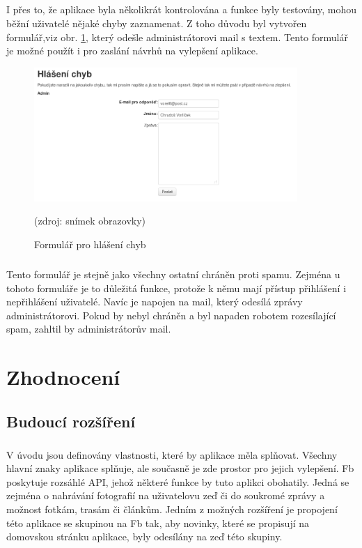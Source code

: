 \documentclass[11pt,a4paper,titlepage,oneside]{book}
\begin{document}
		\paragraph{}I přes to, že aplikace byla několikrát kontrolována a funkce byly testovány, mohou běžní uživatelé  nějaké chyby zaznamenat. Z toho důvodu byl vytvořen formulář,viz obr. \ref{fig:error}, který odešle administrátorovi mail s textem. Tento formulář je možné použít i pro zaslání návrhů na vylepšení aplikace. 
		\begin{figure}[!h]
			\begin{center}
				\includegraphics[width=10cm]{obrazky/toulavej/error.png}
				\caption{Formulář pro hlášení chyb}
				\label{fig:error}
				(zdroj: snímek obrazovky)
			\end{center}
		\end{figure}	
		\paragraph{}Tento formulář je stejně jako všechny ostatní chráněn proti spamu. Zejména u tohoto formuláře je to důležitá funkce, protože k němu mají přístup přihlášení i nepřihlášení uživatelé. Navíc je napojen na mail, který odesílá zprávy administrátorovi. Pokud by nebyl chráněn a byl napaden robotem rozesílající spam, zahltil by administrátorův mail.

		

	\chapter{Zhodnocení}
		\section{Budoucí rozšíření}
			\label{sec:budoucnost}
			\paragraph{}V úvodu jsou definovány vlastnosti, které by aplikace měla splňovat. Všechny hlavní znaky aplikace splňuje, ale současně je zde prostor pro jejich vylepšení. \ac{Fb} poskytuje rozsáhlé \ac{API}, jehož některé funkce by tuto aplikci obohatily. Jedná se zejména o nahrávání fotografií na uživatelovu zeď či do soukromé zprávy a možnost  fotkám, trasám či článkům. Jedním z možných rozšíření je propojení této aplikace se skupinou na \ac{Fb} tak, aby novinky, které se propisují na domovskou stránku aplikace, byly odesílány na zeď této skupiny.
\end{document}

